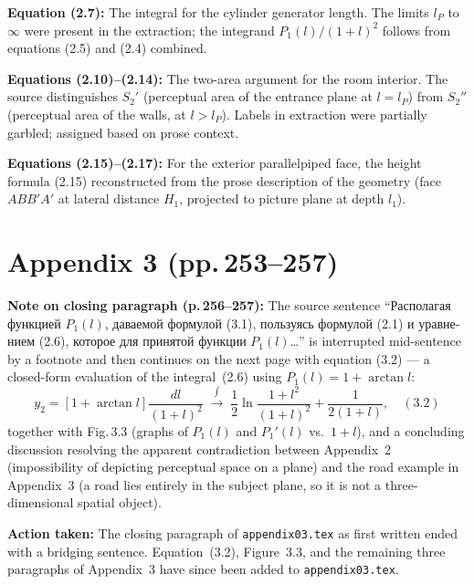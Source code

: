 \documentclass[12pt]{article}
\begin{document}
\textbf{Equation (2.7):} The integral for the cylinder generator length. The
limits $l_P$ to $\infty$ were present in the extraction; the integrand
$P_1(l)/(1+l)^2$ follows from equations (2.5) and (2.4) combined.

\textbf{Equations (2.10)--(2.14):} The two-area argument for the room interior.
The source distinguishes $S_2'$ (perceptual area of the entrance plane at
$l = l_P$) from $S_2''$ (perceptual area of the walls, at $l > l_P$). Labels
in extraction were partially garbled; assigned based on prose context.

\textbf{Equations (2.15)--(2.17):} For the exterior parallelpiped face, the
height formula (2.15) reconstructed from the prose description of the geometry
(face $ABB'A'$ at lateral distance $H_1$, projected to picture plane at depth
$l_1$).

\section*{Appendix 3 (pp.\,253--257)}

\textbf{Note on closing paragraph (p.\,256--257):} The source sentence
``\foreignlanguage{russian}{Располагая функцией} $P_1(l)$, \foreignlanguage{russian}{даваемой формулой} (3.1), \foreignlanguage{russian}{пользуясь формулой}
(2.1) \foreignlanguage{russian}{и уравнением} (2.6), \foreignlanguage{russian}{которое для принятой функции} $P_1(l)$\ldots'' is
interrupted mid-sentence by a footnote and then continues on the next page with
equation (3.2) --- a closed-form evaluation of the integral~(2.6) using
$P_1(l) = 1 + \arctan l$:
\[
  y_2 = \left[1 + \arctan l\right]\frac{dl}{(1+l)^2}
  \;\xrightarrow{\;\int\;}\;
  \frac{1}{2}\ln\!\frac{1+l^2}{(1+l)^2} + \frac{1}{2(1+l)},
  \quad (3.2)
\]
together with Fig.\,3.3 (graphs of $P_1(l)$ and $P_1'(l)$ vs.\ $1+l$), and a
concluding discussion resolving the apparent contradiction between Appendix~2
(impossibility of depicting perceptual space on a plane) and the road example in
Appendix~3 (a road lies entirely in the subject plane, so it is not a
three-dimensional spatial object).

\textbf{Action taken:} The closing paragraph of \texttt{appendix03.tex} as
first written ended with a bridging sentence. Equation~(3.2), Figure~3.3, and
the remaining three paragraphs of Appendix~3 have since been added to
\texttt{appendix03.tex}.

\end{document}
